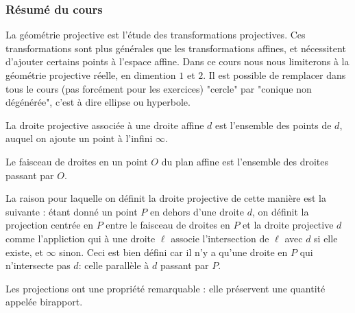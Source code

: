 
\subsubsection{Résumé du cours}

La géométrie projective est l'étude des transformations projectives. Ces transformations sont plus générales que les transformations affines, et nécessitent d'ajouter certains points à l'espace affine. Dans ce cours nous nous limiterons à la géométrie projective réelle, en dimention $1$ et $2$. Il est possible de remplacer dans tous le cours (pas forcément pour les exercices) "cercle" par "conique non dégénérée", c'est à dire ellipse ou hyperbole.


\begin{dfn}
La droite projective associée à une droite affine $d$ est l'ensemble des points de $d$, auquel on ajoute un point à l'infini $\infty$.

\medskip

Le faisceau de droites en un point $O$ du plan affine est l'ensemble des droites passant par $O$.
\end{dfn}

La raison pour laquelle on définit la droite projective de cette manière est la suivante : étant donné un point $P$ en dehors d'une droite $d$, on définit la projection centrée en $P$ entre le faisceau de droites en $P$ et la droite projective $d$ comme l'appliction qui à une droite $\ell$ associe l'intersection de $\ell$ avec $d$ si elle existe, et $\infty$ sinon. Ceci est bien défini car il n'y a qu'une droite en $P$ qui n'intersecte pas $d$: celle parallèle à $d$ passant par $P$.

\medskip

Les projections ont une propriété remarquable : elle préservent une quantité appelée birapport.

